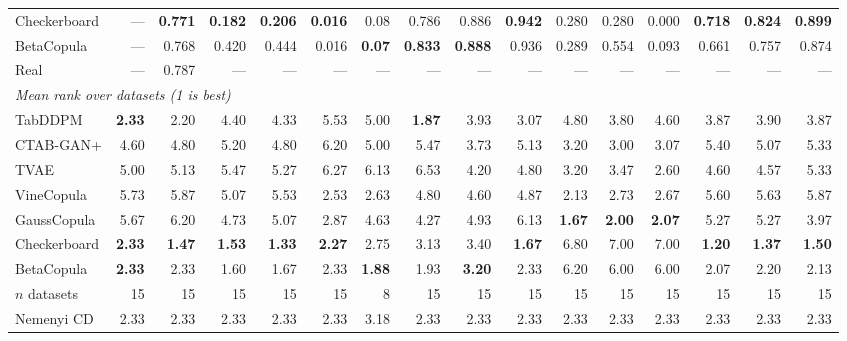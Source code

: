 \begin{tabular}{lrrrrrrrrrrrrrrr}
\addlinespace[2pt]
Checkerboard & --- & \textbf{0.771} & \textbf{0.182} & \textbf{0.206} & \textbf{0.016} & 0.08 & 0.786 & 0.886 & \textbf{0.942} & 0.280 & 0.280 & 0.000 & \textbf{0.718} & \textbf{0.824} & \textbf{0.899} \\
BetaCopula & --- & 0.768 & 0.420 & 0.444 & 0.016 & \textbf{0.07} & \textbf{0.833} & \textbf{0.888} & 0.936 & 0.289 & 0.554 & 0.093 & 0.661 & 0.757 & 0.874 \\
\addlinespace[2pt]
Real & --- & 0.787 & --- & --- & --- & --- & --- & --- & --- & --- & --- & --- & --- & --- & --- \\
\midrule
\multicolumn{16}{l}{\emph{Mean rank over datasets (1 is best)}} \\
TabDDPM & \textbf{2.33} & 2.20 & 4.40 & 4.33 & 5.53 & 5.00 & \textbf{1.87} & 3.93 & 3.07 & 4.80 & 3.80 & 4.60 & 3.87 & 3.90 & 3.87 \\
CTAB-GAN+ & 4.60 & 4.80 & 5.20 & 4.80 & 6.20 & 5.00 & 5.47 & 3.73 & 5.13 & 3.20 & 3.00 & 3.07 & 5.40 & 5.07 & 5.33 \\
TVAE & 5.00 & 5.13 & 5.47 & 5.27 & 6.27 & 6.13 & 6.53 & 4.20 & 4.80 & 3.20 & 3.47 & 2.60 & 4.60 & 4.57 & 5.33 \\
\addlinespace[2pt]
VineCopula & 5.73 & 5.87 & 5.07 & 5.53 & 2.53 & 2.63 & 4.80 & 4.60 & 4.87 & 2.13 & 2.73 & 2.67 & 5.60 & 5.63 & 5.87 \\
GaussCopula & 5.67 & 6.20 & 4.73 & 5.07 & 2.87 & 4.63 & 4.27 & 4.93 & 6.13 & \textbf{1.67} & \textbf{2.00} & \textbf{2.07} & 5.27 & 5.27 & 3.97 \\
\addlinespace[2pt]
Checkerboard & \textbf{2.33} & \textbf{1.47} & \textbf{1.53} & \textbf{1.33} & \textbf{2.27} & 2.75 & 3.13 & 3.40 & \textbf{1.67} & 6.80 & 7.00 & 7.00 & \textbf{1.20} & \textbf{1.37} & \textbf{1.50} \\
BetaCopula & \textbf{2.33} & 2.33 & 1.60 & 1.67 & 2.33 & \textbf{1.88} & 1.93 & \textbf{3.20} & 2.33 & 6.20 & 6.00 & 6.00 & 2.07 & 2.20 & 2.13 \\
\addlinespace[2pt]
$n$ datasets & 15 & 15 & 15 & 15 & 15 & 8 & 15 & 15 & 15 & 15 & 15 & 15 & 15 & 15 & 15 \\
Nemenyi CD & 2.33 & 2.33 & 2.33 & 2.33 & 2.33 & 3.18 & 2.33 & 2.33 & 2.33 & 2.33 & 2.33 & 2.33 & 2.33 & 2.33 & 2.33 \\
\bottomrule
\end{tabular}
\endgroup

